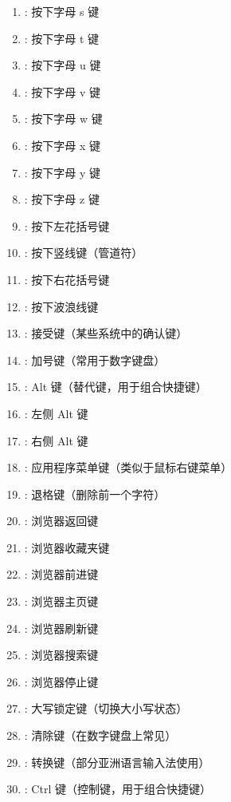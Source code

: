\begin{enumerate}[label=\arabic*)]
    \item {}: 按下字母 s 键
    \item {}: 按下字母 t 键
    \item {}: 按下字母 u 键
    \item {}: 按下字母 v 键
    \item {}: 按下字母 w 键
    \item {}: 按下字母 x 键
    \item {}: 按下字母 y 键
    \item {}: 按下字母 z 键
    \item \codeinline{\{}: 按下左花括号键
    \item \codeinline{|}: 按下竖线键（管道符）
    \item \codeinline{\}}: 按下右花括号键
    \item \codeinline{~}: 按下波浪线键
    \item {}: 接受键（某些系统中的确认键）
    \item {}: 加号键（常用于数字键盘）
    \item {}: Alt 键（替代键，用于组合快捷键）
    \item {}: 左侧 Alt 键
    \item {}: 右侧 Alt 键
    \item {}: 应用程序菜单键（类似于鼠标右键菜单）
    \item {}: 退格键（删除前一个字符）
    \item {}: 浏览器返回键
    \item {}: 浏览器收藏夹键
    \item {}: 浏览器前进键
    \item {}: 浏览器主页键
    \item {}: 浏览器刷新键
    \item {}: 浏览器搜索键
    \item {}: 浏览器停止键
    \item {}: 大写锁定键（切换大小写状态）
    \item {}: 清除键（在数字键盘上常见）
    \item {}: 转换键（部分亚洲语言输入法使用）
    \item {}: Ctrl 键（控制键，用于组合快捷键）

\end{enumerate}
